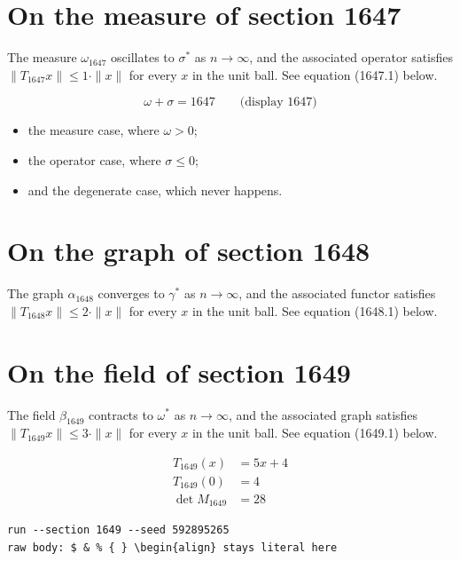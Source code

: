 \documentclass{article}
\begin{document}
\section{On the measure of section 1647}
The measure $\omega_{1647}$ oscillates to $\sigma^{*}$ as $n \to \infty$,
and the associated operator satisfies $\|T_{1647} x\| \leq 1 \cdot \|x\|$
for every $x$ in the unit ball. See equation (1647.1) below.

$$
\omega + \sigma = 1647 \qquad \text{(display 1647)}
$$

\begin{itemize}
  \item the measure case, where $\omega > 0$;
  \item the operator case, where $\sigma \leq 0$;
  \item and the degenerate case, which never happens.
\end{itemize}

\section{On the graph of section 1648}
The graph $\alpha_{1648}$ converges to $\gamma^{*}$ as $n \to \infty$,
and the associated functor satisfies $\|T_{1648} x\| \leq 2 \cdot \|x\|$
for every $x$ in the unit ball. See equation (1648.1) below.

\section{On the field of section 1649}
The field $\beta_{1649}$ contracts to $\omega^{*}$ as $n \to \infty$,
and the associated graph satisfies $\|T_{1649} x\| \leq 3 \cdot \|x\|$
for every $x$ in the unit ball. See equation (1649.1) below.

\begin{align}
T_{1649}(x) &= 5 x + 4 \\
T_{1649}(0) &= 4 \\
\det M_{1649} &= 28
\end{align}

\begin{verbatim}
run --section 1649 --seed 592895265
raw body: $ & % { } \begin{align} stays literal here
\end{verbatim}
\end{document}
